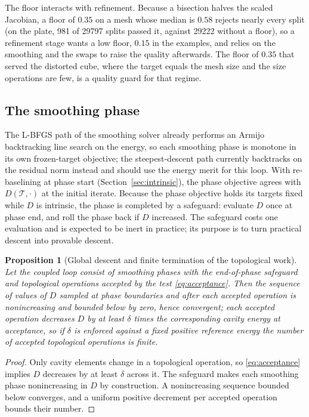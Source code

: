 \documentclass[11pt]{article}
\newtheorem{proposition}{Proposition}
\begin{document}
The floor interacts with refinement. Because a bisection halves the
scaled Jacobian, a floor of $0.35$ on a mesh whose median is $0.58$
rejects nearly every split (on the plate, 981 of 29797 splits passed it,
against 29222 without a floor), so a refinement stage wants a low floor,
$0.15$ in the examples, and relies on the smoothing and the swaps to
raise the quality afterwards. The floor of $0.35$ that served the
distorted cube, where the target equals the mesh size and the size
operations are few, is a quality guard for that regime.

\subsection{The smoothing phase}

The L-BFGS path of the smoothing solver already performs an Armijo
backtracking line search on the energy, so each smoothing phase is
monotone in its own frozen-target objective; the steepest-descent path
currently backtracks on the residual norm instead and should use the
energy merit for this loop. With re-baselining at phase start
(Section~\ref{sec:intrinsic}), the phase objective agrees with
$D(\mathcal{T}, \cdot)$ at the initial iterate. Because the phase
objective holds its targets fixed while $D$ is intrinsic, the phase is
completed by a safeguard: evaluate $D$ once at phase end, and roll the
phase back if $D$ increased. The safeguard costs one evaluation and is
expected to be inert in practice; its purpose is to turn practical
descent into provable descent.

\begin{proposition}[Global descent and finite termination of the
topological work]
\label{prop:descent}
Let the coupled loop consist of smoothing phases with the end-of-phase
safeguard and topological operations accepted by the test
\eqref{eq:acceptance}. Then the sequence of values of $D$ sampled at phase
boundaries and after each accepted operation is nonincreasing and
bounded below by zero, hence convergent; each accepted operation
decreases $D$ by at least $\delta$ times the corresponding cavity
energy at acceptance, so if $\delta$ is enforced against a fixed
positive reference energy the number of accepted topological operations
is finite.
\end{proposition}

\begin{proof}
Only cavity elements change in a topological operation, so
\eqref{eq:acceptance} implies $D$ decreases by at least $\delta$ across it.
The safeguard makes each smoothing phase nonincreasing in $D$ by
construction. A nonincreasing sequence bounded below converges, and a
uniform positive decrement per accepted operation bounds their number.
\end{proof}
\end{document}
